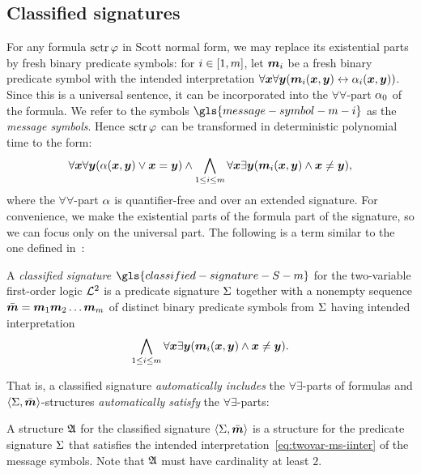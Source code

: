 \subsection{Classified signatures}
For any formula $\operatorname{sctr}\varphi$ in Scott normal form, we may replace its
existential parts by fresh binary predicate symbols: for $i \in [1,m]$, let
$\bm{m}_{i}$ be a fresh binary predicate symbol with the intended interpretation
$\forall\bm{x}\forall\bm{y} (\bm{m}_{i}(\bm{x},\bm{y}) \leftrightarrow \alpha_{i}(\bm{x},\bm{y}))$. Since this
is a universal sentence, it can be incorporated into the $\forall\forall$-part
$\alpha_{0}$ of the formula.
We refer to the symbols $\gls{message-symbol-m-i}$ as the \emph{message
symbols}.
Hence $\operatorname{sctr}\varphi$ can be transformed in deterministic polynomial time to the
form:
\begin{equation}\label{eq:twovar-msg-nf}
  \forall\xx\forall\yy (\falp(\xx,\yy) \lor \xx = \yy) \land
  \bigwedge_{1 \leq \ii \leq \nm} \forall\xx\exists\yy
  (\smm\ii(\xx,\yy) \land \xx \neq \yy),
\end{equation}
where the $\forall\forall$-part $\alpha$ is quantifier-free and over an extended
signature. For convenience, we make the existential parts of the formula part of
the signature, so we can focus only on the universal part. The following is a
term similar to the one defined in~\cite{MALQ:MALQ201400102}:
\begin{definition}
A \emph{classified signature} $\gls{classified-signature-S-m}$ for the
two-variable first-order logic $\mathcal{L}^{2}$ is a predicate signature $\mathrm{\Sigma}$ together
with a nonempty sequence $\sms = \smm1\smm2\dots\smm\nm$ of distinct binary
predicate symbols from $\mathrm{\Sigma}$ having intended interpretation
\begin{equation}\label{eq:twovar-ms-iinter}
  \bigwedge_{1 \leq \ii \leq \nm} \forall\xx\exists\yy 
  (\smm\ii(\xx,\yy) \land \xx \neq \yy).
\end{equation}
\end{definition}
That is, a classified signature \emph{automatically includes} the
$\forall\exists$-parts of formulas and $\left\langle \mathrm{\Sigma},\bar{\bm{m}} \right\rangle$-structures
\emph{automatically satisfy} the $\forall\exists$-parts:
\begin{definition}
A structure $\mathfrak{A}$ for the classified signature $\left\langle \mathrm{\Sigma},\bar{\bm{m}} \right\rangle$ is a
structure for the predicate signature $\mathrm{\Sigma}$ that satisfies the intended
interpretation~\cref{eq:twovar-ms-iinter} of the message symbols. Note that
$\mathfrak{A}$ must have cardinality at least $2$.
\end{definition}


